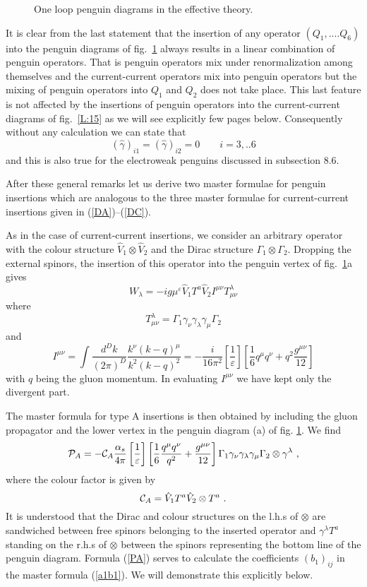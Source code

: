 \documentclass[12pt]{article}
\def\as{\alpha_s}
\newcommand{\be}{\begin{equation}}
\newcommand{\ee}{\end{equation}}
\begin{document}
\begin{itemize}
\begin{itemize}
\begin{figure}[hbt]
{}%
\vspace{0.08in}
\caption[]{One loop penguin diagrams in the effective theory.
\label{L:16}}
\end{figure}
It is clear from the last statement that the insertion of any
operator $(Q_1,....Q_6)$ into the penguin diagrams of fig.~\ref{L:16}
always results in a linear combination of penguin operators.
That is penguin operators  mix under renormalization among
themselves and the current-current operators  mix into
penguin operators but the mixing of penguin operators into
$Q_1$ and $Q_2$ does not take place. This last feature is
not affected by the insertions of penguin operators into
the current-current diagrams of fig.~\ref{L:15} as we will see
explicitly few pages below. Consequently without any calculation
we can state that
\be
(\hat\gamma)_{i1}=(\hat\gamma)_{i2}=0\quad\quad i=3,..6
\ee
and this is also true for the electroweak penguins discussed
in subsection 8.6. 

After these general remarks let us derive two master formulae
for penguin insertions which are analogous to the three master
formulae for current-current insertions given in 
(\ref{DA})--(\ref{DC}).

As in the case of current-current insertions, we consider an 
arbitrary operator with the colour structure $\hat V_1\otimes \hat V_2$
and the Dirac structure $\Gamma_1\otimes\Gamma_2$. Dropping the external
spinors, the insertion of this operator into the penguin vertex of
fig.~\ref{L:16}a  gives
\be\label{WL}
W_\lambda=-i g \mu^\varepsilon \hat V_1 T^a \hat V_2 I^{\mu\nu}
T^\lambda_{\mu\nu}
\ee
where
\be
T^\lambda_{\mu\nu}=\Gamma_1 \gamma_\nu \gamma_\lambda\gamma_\mu \Gamma_2
\ee
and
\be
I^{\mu\nu}=\int\frac{d^Dk}{(2\pi)^D}
\frac{k^\nu (k-q)^\mu}{k^2 (k-q)^2}=
-\frac{i}{16\pi^2} \left[\frac{1}{\varepsilon}\right]
\left[\frac{1}{6}q^\mu q^\nu+q^2\frac{g^{\mu\nu}}{12}\right]
\ee
with $q$ being the gluon momentum. In evaluating $I^{\mu\nu}$
we have kept only the divergent part.

The master formula for type A insertions is then obtained by including
the gluon propagator and the lower vertex in the penguin diagram (a)
of fig. \ref{L:16}. We find
\be\label{PA}
{\cal P}_A= -{\cal C}_A \frac{\as}{4\pi} 
\left[\frac{1}{\varepsilon}\right]
\left[\frac{1}{6}\frac{q^\mu q^\nu}{q^2}+\frac{g^{\mu\nu}}{12}\right]
\Gamma_1\gamma_\nu\gamma_\lambda\gamma_\mu\Gamma_2\otimes \gamma^\lambda~,
\ee
where the colour factor is given by
\be\label{PAC}
{\cal C}_A=\hat V_1 T^a\hat V_2\otimes T^a~.
\ee
It is understood that the Dirac and colour structures on the l.h.s of 
$\otimes$ are sandwiched between free spinors belonging to the
inserted operator and $\gamma^\lambda T^a$ standing on the r.h.s of 
$\otimes$ between the spinors representing the bottom line of the
penguin diagram. Formula (\ref{PA}) serves to calculate the
coefficients $(b_1)_{ij}$ in the master formula (\ref{a1b1}). We will
demonstrate this explicitly below.


\end{itemize}
\end{itemize}
\end{document}
